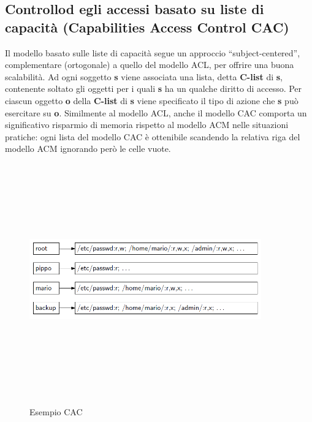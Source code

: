 \subsection{Controllod egli accessi basato su liste di capacità (Capabilities Access Control CAC)}
Il modello basato sulle liste di capacità segue un approccio “subject-centered”, complementare (ortogonale) a quello del modello ACL, per offrire una buona scalabilità. Ad ogni soggetto \textbf{s} viene associata una lista, detta \textbf{C-list} di \textbf{s}, contenente soltato gli oggetti per i quali \textbf{s} ha un qualche diritto di accesso. Per ciascun oggetto \textbf{o} della \textbf{C-list} di \textbf{s} viene specificato il tipo di azione che \textbf{s} può esercitare su \textbf{o}. Similmente al modello ACL, anche il modello CAC comporta un significativo risparmio di memoria rispetto al modello ACM nelle situazioni pratiche: ogni lista del modello CAC è ottenibile scandendo la relativa riga del modello ACM ignorando però le celle vuote. 
\begin{figure}[htbp]
	\centering%
	\subfigure%
	{\includegraphics[height=10cm, width=10cm, keepaspectratio]{Immagini/Capitolo1/CAC_ex.png}}
	\caption{Esempio CAC \label{fig:CAC}} 	
\end{figure}
